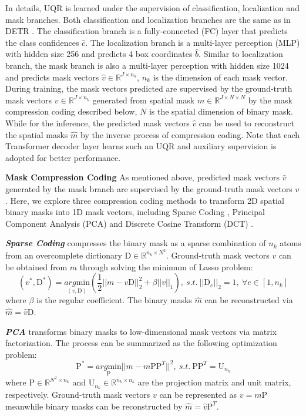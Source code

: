 \documentclass{article}
\begin{document}
In details, UQR is learned under the supervision of classification, localization and mask branches. Both classification and localization branches are the same as in DETR \cite{carion2020detr}. The classification branch is a fully-connected (FC) layer that predicts the class confidences $\hat{c}$. The localization branch is a multi-layer perception (MLP) with hidden size 256 and predicts 4 box coordinates $\hat{b}$. Similar to localization branch, the mask branch is also a multi-layer perception with hidden size 1024 and predicts mask vectors $\hat{v}\in\mathbb{R}^{J \times n_{k}}$, $n_{k}$ is the dimension of each mask vector. During training, the mask vectors predicted are supervised by the ground-truth mask vectors $v\in\mathbb{R}^{J \times n_{k}}$ generated from spatial mask $m\in\mathbb{R}^{J \times N \times N}$ by the mask compression coding described below, $N$ is the spatial dimension of binary mask. While for the inference, the predicted mask vectors $\hat{v}$ can be used to reconstruct the spatial masks $\hat{m}$ by the inverse process of compression coding. Note that each Transformer decoder layer learns such an UQR and auxiliary supervision is adopted for better performance. 




\textbf{Mask Compression Coding}
As mentioned above, predicted mask vectors $\hat{v}$ generated by the mask branch are supervised by the ground-truth mask vectors $v$. Here, we explore three compression coding methods to transform 2D spatial binary masks into 1D mask vectors, including Sparse Coding \cite{donoho2006compressed}, Principal Component Analysis (PCA) \cite{wold1987principal} and Discrete Cosine Transform (DCT) \cite{ahmed1974discrete}. 


\textbf{\textit{Sparse Coding}} compresses the binary mask as a sparse combination of $n_{k}$ atoms from an overcomplete dictionary $\mathrm{D}\in\mathbb{R}^{n_{k} \times N^{2}}$. Ground-truth mask vectors $v$ can be obtained from $m$ through solving the minimum of Lasso \cite{tibshirani1996regression} problem:
\begin{equation}
\label{eq:spc}
(v^{*},\mathrm{D}^{*}) =  \underset{(v,\mathrm{D})}{arg\mathrm{min}}(\frac{1}{2}||m-v\mathrm{D}||_{2}^{2} + \beta||v||_{1}),~\textit{s.t.}~||\mathrm{D}_{e}||_{2}=1,~ \forall e\in[1,n_{k}]
\end{equation}
where $\beta$ is the regular coefficient. The binary masks $\hat{m}$ can be reconstructed via $\hat{m}=\hat{v}\mathrm{D}$.

\textbf{\textit{PCA}} transforms binary masks to low-dimensional mask vectors via matrix factorization. The process can be summarized as the following optimization problem:
\begin{equation}
\label{eq:pca}
\mathrm{P}^{*}=\underset{\mathrm{P}}{arg\mathrm{min}} ||m-m\mathrm{P}\mathrm{P}^{T}||^{2},~\textit{s.t.}~\mathrm{P}\mathrm{P}^{T}=\mathrm{U}_{n_{k}}
\end{equation}
where $\mathrm{P} \in \mathbb{R}^{N^{2} \times n_{k}}$ and $\mathrm{U}_{n_{k}} \in \mathbb{R}^{n_{k} \times n_{k}}$ are the projection matrix and unit matrix, respectively. Ground-truth mask vectors $v$ can be represented as $v=m\mathrm{P}$ meanwhile binary masks can be reconstructed by $\hat{m}=\hat{v}\mathrm{P}^{T}$.
\end{document}
